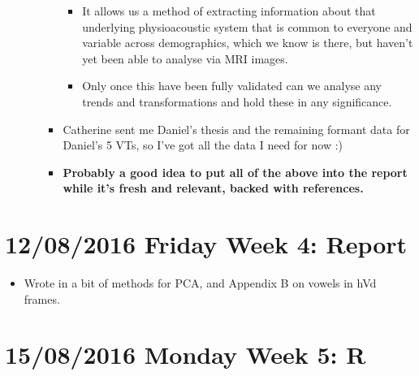 \documentclass{article}
\begin{document}
\begin{itemize}
\begin{itemize}
\begin{itemize}
\begin{itemize}
                \item It allows us a method of extracting information about that underlying physioacoustic system that is common to everyone and variable across demographics, which we know is there, but haven't yet been able to analyse via MRI images.
                \item Only once this have been fully validated can we analyse any trends and transformations and hold these in any significance.
            \end{itemize}
            \item Catherine sent me Daniel's thesis and the remaining formant data for Daniel's 5 VTs, so I've got all the data I need for now :)
            \item \textbf{Probably a good idea to put all of the above into the report while it's fresh and relevant, backed with references.}
        \end{itemize}
    \end{itemize}
\end{itemize}

\section*{12/08/2016 Friday Week 4: Report}
\begin{itemize}
    \item Wrote in a bit of methods for PCA, and Appendix B on vowels in hVd frames.
\end{itemize}

\section*{15/08/2016 Monday Week 5: R}
\end{document}
